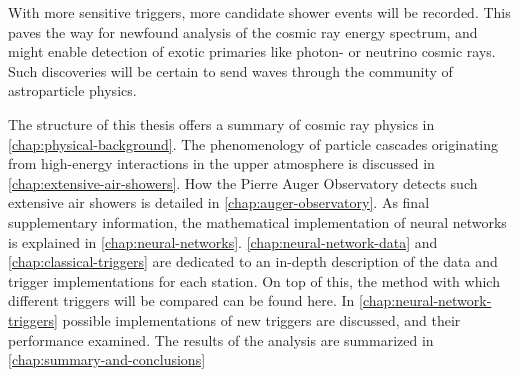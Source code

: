With more sensitive triggers, more candidate shower events will be recorded. This paves the way for newfound analysis of the cosmic ray energy spectrum, and might
enable detection of exotic primaries like photon- or neutrino cosmic rays. Such discoveries will be certain to send waves through the community of astroparticle 
physics.

The structure of this thesis offers a summary of cosmic ray physics in \autoref{chap:physical-background}. The phenomenology of particle cascades originating from 
high-energy interactions in the upper atmosphere is discussed in \autoref{chap:extensive-air-showers}. How the Pierre Auger Observatory detects such extensive air 
showers is detailed in \autoref{chap:auger-observatory}. As final supplementary information, the mathematical implementation of neural networks is explained in 
\autoref{chap:neural-networks}. \autoref{chap:neural-network-data} and \autoref{chap:classical-triggers} are dedicated to an in-depth description of the data and 
trigger implementations for each station. On top of this, the method with which different triggers will be compared can be found here. In 
\autoref{chap:neural-network-triggers} possible implementations of new triggers are discussed, and their performance examined. The results of the analysis are 
summarized in \autoref{chap:summary-and-conclusions}


